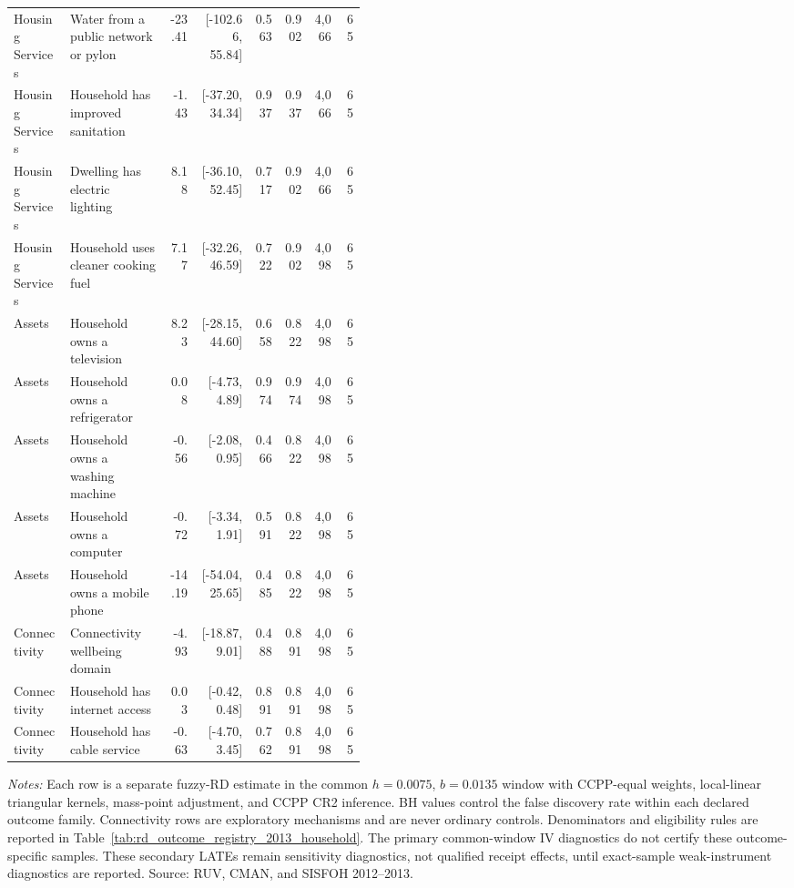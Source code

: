 \begin{longtable}{p{0.16\linewidth}p{0.29\linewidth}rrrrrr}
Housing Services & Water from a public network or pylon & -23.41 & [-102.66, 55.84] & 0.563 & 0.902 & 4,066 & 65 \\
Housing Services & Household has improved sanitation & -1.43 & [-37.20, 34.34] & 0.937 & 0.937 & 4,066 & 65 \\
Housing Services & Dwelling has electric lighting & 8.18 & [-36.10, 52.45] & 0.717 & 0.902 & 4,066 & 65 \\
Housing Services & Household uses cleaner cooking fuel & 7.17 & [-32.26, 46.59] & 0.722 & 0.902 & 4,098 & 65 \\
Assets & Household owns a television & 8.23 & [-28.15, 44.60] & 0.658 & 0.822 & 4,098 & 65 \\
Assets & Household owns a refrigerator & 0.08 & [-4.73, 4.89] & 0.974 & 0.974 & 4,098 & 65 \\
Assets & Household owns a washing machine & -0.56 & [-2.08, 0.95] & 0.466 & 0.822 & 4,098 & 65 \\
Assets & Household owns a computer & -0.72 & [-3.34, 1.91] & 0.591 & 0.822 & 4,098 & 65 \\
Assets & Household owns a mobile phone & -14.19 & [-54.04, 25.65] & 0.485 & 0.822 & 4,098 & 65 \\
Connectivity & Connectivity wellbeing domain & -4.93 & [-18.87, 9.01] & 0.488 & 0.891 & 4,098 & 65 \\
Connectivity & Household has internet access & 0.03 & [-0.42, 0.48] & 0.891 & 0.891 & 4,098 & 65 \\
Connectivity & Household has cable service & -0.63 & [-4.70, 3.45] & 0.762 & 0.891 & 4,098 & 65 \\
\bottomrule
\end{longtable}
\begin{minipage}{0.98\linewidth}\footnotesize\textit{Notes:} Each row is a separate fuzzy-RD estimate in the common \(h=0.0075\), \(b=0.0135\) window with CCPP-equal weights, local-linear triangular kernels, mass-point adjustment, and CCPP CR2 inference. BH values control the false discovery rate within each declared outcome family. Connectivity rows are exploratory mechanisms and are never ordinary controls. Denominators and eligibility rules are reported in Table~\ref{tab:rd_outcome_registry_2013_household}. The primary common-window IV diagnostics do not certify these outcome-specific samples. These secondary LATEs remain sensitivity diagnostics, not qualified receipt effects, until exact-sample weak-instrument diagnostics are reported. Source: RUV, CMAN, and SISFOH 2012--2013.\end{minipage}
\endgroup
